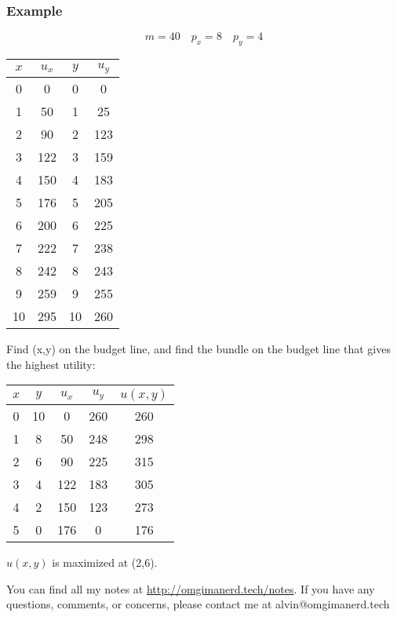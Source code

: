 \documentclass[letterpaper, 12pt]{article}
\begin{document}
\subsubsection{Example}
\[ m = 40 \quad p_{x} = 8 \quad p_{y} = 4 \]
\begin{center}
  \begin{tabular}{|c|c|c|c|}
    \hline
    \( x \) & \( u_{x} \) & \(y \) & \( u_{y} \) \\ \hline
    0       & 0           & 0      & 0           \\ \hline
    1       & 50          & 1      & 25          \\ \hline
    2       & 90          & 2      & 123         \\ \hline
    3       & 122         & 3      & 159         \\ \hline
    4       & 150         & 4      & 183         \\ \hline
    5       & 176         & 5      & 205         \\ \hline
    6       & 200         & 6      & 225         \\ \hline
    7       & 222         & 7      & 238         \\ \hline
    8       & 242         & 8      & 243         \\ \hline
    9       & 259         & 9      & 255         \\ \hline
    10      & 295         & 10     & 260         \\ \hline
  \end{tabular}
\end{center}
Find (x,y) on the budget line, and find the bundle on the budget line that
gives the highest utility:
\begin{center}
  \begin{tabular}{|c|c|c|c|c|}
    \hline
    \( x \) & \( y \) & \( u_{x} \) & \( u_{y} \) & \( u(x,y) \) \\ \hline
    0       & 10      & 0           & 260         & 260          \\ \hline
    1       & 8       & 50          & 248         & 298          \\ \hline
    2       & 6       & 90          & 225         & 315          \\ \hline
    3       & 4       & 122         & 183         & 305          \\ \hline
    4       & 2       & 150         & 123         & 273          \\ \hline
    5       & 0       & 176         & 0           & 176          \\ \hline
  \end{tabular}
\end{center}
\( u(x,y) \) is maximized at (2,6).

\begin{center}
  You can find all my notes at \url{http://omgimanerd.tech/notes}. If you have
  any questions, comments, or concerns, please contact me at
  alvin@omgimanerd.tech
\end{center}
\end{document}

